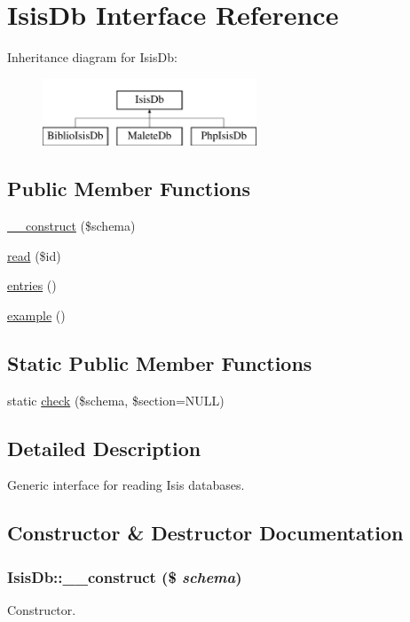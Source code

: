 \hypertarget{interfaceIsisDb}{
\section{IsisDb Interface Reference}
\label{interfaceIsisDb}
}
Inheritance diagram for IsisDb:\begin{figure}[H]
\begin{center}
\leavevmode
\includegraphics[height=2cm]{interfaceIsisDb}
\end{center}
\end{figure}
\subsection*{Public Member Functions}
\begin{DoxyCompactItemize}
\item 
\hyperlink{interfaceIsisDb_ae1c0a3496d55f710d34c5c19ada7a66b}{\_\-\_\-construct} (\$schema)
\item 
\hyperlink{interfaceIsisDb_a68335ec0db01ef03f0725621b38b5686}{read} (\$id)
\item 
\hyperlink{interfaceIsisDb_a86f38eca2b6d0835b60770d8a4e511ff}{entries} ()
\item 
\hyperlink{interfaceIsisDb_a857c10d90da64067efa17afb2f32edb6}{example} ()
\end{DoxyCompactItemize}
\subsection*{Static Public Member Functions}
\begin{DoxyCompactItemize}
\item 
static \hyperlink{interfaceIsisDb_af681b8f990b579f1835aa7ba4c83f1b8}{check} (\$schema, \$section=NULL)
\end{DoxyCompactItemize}


\subsection{Detailed Description}
Generic interface for reading Isis databases. 

\subsection{Constructor \& Destructor Documentation}
\hypertarget{interfaceIsisDb_ae1c0a3496d55f710d34c5c19ada7a66b}{
\subsubsection[{\_\-\_\-construct}]{\setlength{\rightskip}{0pt plus 5cm}IsisDb::\_\-\_\-construct (\$ {\em schema})}}
\label{interfaceIsisDb_ae1c0a3496d55f710d34c5c19ada7a66b}
Constructor.

